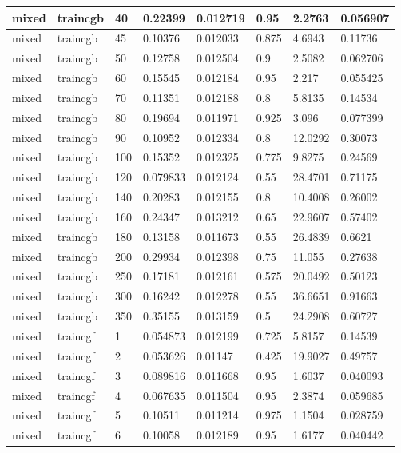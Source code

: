 \begin{longtable}{llllllll}
mixed & traincgb & 40 & 0.22399 & 0.012719 & 0.95 & 2.2763 & 0.056907 \\ \hline 
mixed & traincgb & 45 & 0.10376 & 0.012033 & 0.875 & 4.6943 & 0.11736 \\ \hline 
mixed & traincgb & 50 & 0.12758 & 0.012504 & 0.9 & 2.5082 & 0.062706 \\ \hline 
mixed & traincgb & 60 & 0.15545 & 0.012184 & 0.95 & 2.217 & 0.055425 \\ \hline 
mixed & traincgb & 70 & 0.11351 & 0.012188 & 0.8 & 5.8135 & 0.14534 \\ \hline 
mixed & traincgb & 80 & 0.19694 & 0.011971 & 0.925 & 3.096 & 0.077399 \\ \hline 
mixed & traincgb & 90 & 0.10952 & 0.012334 & 0.8 & 12.0292 & 0.30073 \\ \hline 
mixed & traincgb & 100 & 0.15352 & 0.012325 & 0.775 & 9.8275 & 0.24569 \\ \hline 
mixed & traincgb & 120 & 0.079833 & 0.012124 & 0.55 & 28.4701 & 0.71175 \\ \hline 
mixed & traincgb & 140 & 0.20283 & 0.012155 & 0.8 & 10.4008 & 0.26002 \\ \hline 
mixed & traincgb & 160 & 0.24347 & 0.013212 & 0.65 & 22.9607 & 0.57402 \\ \hline 
mixed & traincgb & 180 & 0.13158 & 0.011673 & 0.55 & 26.4839 & 0.6621 \\ \hline 
mixed & traincgb & 200 & 0.29934 & 0.012398 & 0.75 & 11.055 & 0.27638 \\ \hline 
mixed & traincgb & 250 & 0.17181 & 0.012161 & 0.575 & 20.0492 & 0.50123 \\ \hline 
mixed & traincgb & 300 & 0.16242 & 0.012278 & 0.55 & 36.6651 & 0.91663 \\ \hline 
mixed & traincgb & 350 & 0.35155 & 0.013159 & 0.5 & 24.2908 & 0.60727 \\ \hline 
mixed & traincgf & 1 & 0.054873 & 0.012199 & 0.725 & 5.8157 & 0.14539 \\ \hline 
mixed & traincgf & 2 & 0.053626 & 0.01147 & 0.425 & 19.9027 & 0.49757 \\ \hline 
mixed & traincgf & 3 & 0.089816 & 0.011668 & 0.95 & 1.6037 & 0.040093 \\ \hline 
mixed & traincgf & 4 & 0.067635 & 0.011504 & 0.95 & 2.3874 & 0.059685 \\ \hline 
mixed & traincgf & 5 & 0.10511 & 0.011214 & 0.975 & 1.1504 & 0.028759 \\ \hline 
mixed & traincgf & 6 & 0.10058 & 0.012189 & 0.95 & 1.6177 & 0.040442 \\ \hline 

\end{longtable}
